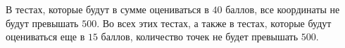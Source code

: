 В тестах, которые будут в сумме оцениваться в $40$ баллов, все координаты не будут превышать $500$. 
Во всех этих тестах, а также в тестах, которые будут оцениваться еще в $15$ баллов, количество точек не 
будет превышать $500$. 
